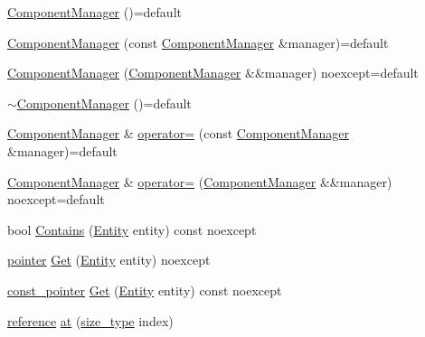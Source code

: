 \begin{DoxyCompactItemize}
\item 
\mbox{\hyperlink{classmage_1_1_component_manager_a836478f73ff1fa49795dd2ed62b0a192}{Component\+Manager}} ()=default
\item 
\mbox{\hyperlink{classmage_1_1_component_manager_a371d054fb052e9ac813b69e39b4dab93}{Component\+Manager}} (const \mbox{\hyperlink{classmage_1_1_component_manager}{Component\+Manager}} \&manager)=default
\item 
\mbox{\hyperlink{classmage_1_1_component_manager_a7412dca61f242beedc37edcbe63b738f}{Component\+Manager}} (\mbox{\hyperlink{classmage_1_1_component_manager}{Component\+Manager}} \&\&manager) noexcept=default
\item 
\mbox{\hyperlink{classmage_1_1_component_manager_a3e8eeb1cff08baee60c3cec2238a490f}{$\sim$\+Component\+Manager}} ()=default
\item 
\mbox{\hyperlink{classmage_1_1_component_manager}{Component\+Manager}} \& \mbox{\hyperlink{classmage_1_1_component_manager_a0ee8c4a8ff585ab544010010542d077c}{operator=}} (const \mbox{\hyperlink{classmage_1_1_component_manager}{Component\+Manager}} \&manager)=default
\item 
\mbox{\hyperlink{classmage_1_1_component_manager}{Component\+Manager}} \& \mbox{\hyperlink{classmage_1_1_component_manager_a10c869ad1b3436fe1cac7d4dafc761e7}{operator=}} (\mbox{\hyperlink{classmage_1_1_component_manager}{Component\+Manager}} \&\&manager) noexcept=default
\item 
bool \mbox{\hyperlink{classmage_1_1_component_manager_ab2e42b8c655b1279b8bd136536e1acfc}{Contains}} (\mbox{\hyperlink{classmage_1_1_entity}{Entity}} entity) const noexcept
\item 
\mbox{\hyperlink{classmage_1_1_component_manager_a8a96debf4c395e068990c85e8b66d564}{pointer}} \mbox{\hyperlink{classmage_1_1_component_manager_aef43a141be2f7ebd0123e4d34b66581b}{Get}} (\mbox{\hyperlink{classmage_1_1_entity}{Entity}} entity) noexcept
\item 
\mbox{\hyperlink{classmage_1_1_component_manager_aca0462fe048337b5453e72cb7facaf31}{const\+\_\+pointer}} \mbox{\hyperlink{classmage_1_1_component_manager_aaf81852975938880f52b60e5d03b9a85}{Get}} (\mbox{\hyperlink{classmage_1_1_entity}{Entity}} entity) const noexcept
\item 
\mbox{\hyperlink{classmage_1_1_component_manager_a4daeb292f527534c155e359faf7eaf80}{reference}} \mbox{\hyperlink{classmage_1_1_component_manager_a79992537bb5e62d6aee7f83860ae49d3}{at}} (\mbox{\hyperlink{classmage_1_1_component_manager_a6bd219525db9ec9f3adb9259e52674da}{size\+\_\+type}} index)

\end{DoxyCompactItemize}
